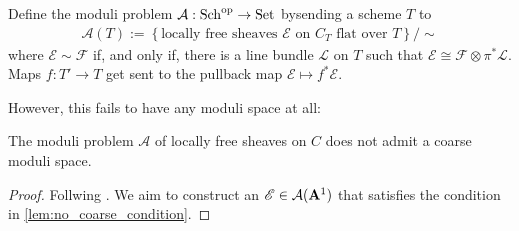 \documentclass[12pt]{ociamthesis}  %
\begin{document}
\begin{definition}
  Define the moduli problem $\mathcal A : \operatorname{Sch}^{\text{op}} \to \operatorname{Set}$
  bysending a scheme $T$ to
  \begin{align*}
    \mathcal A(T) := \left\lbrace{\text{locally free sheaves $\mathscr E$ on $C_T$ flat over $T$}}\right\rbrace/\sim
  \end{align*}
  where $\mathscr E\sim\mathscr F$ if, and only if, there is a line bundle
  $\mathscr L$ on $T$ such that
  $\mathscr E \cong \mathscr F\otimes\pi^* \mathscr L$. Maps
  $f: T'\to T$ get sent to the pullback map
  $\mathscr E\mapsto f^*\mathscr E$.
\end{definition}

However, this fails to have any moduli space at all:

\begin{lemma}\label{lem:no_coarse_moduli_space}
  The moduli problem $\mathcal A$ of locally free sheaves on $C$
  does not admit a coarse moduli space.
  \begin{proof}
    Follwing \cite[Example 2.2]{hoskins2016}. We aim to construct
    an $\mathscr E\in\mathcal A(\mathbf{A}^{1}_{})$ that satisfies the
    condition in \ref{lem:no_coarse_condition}.
    \missingproof
  \end{proof}
\end{lemma}
\end{document}
